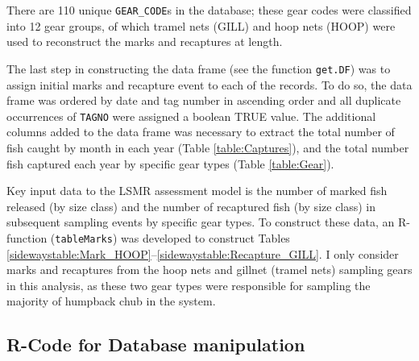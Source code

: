 There are 110 unique \verb"GEAR_CODE"s in the database; these gear codes were classified into 12 gear groups, of which tramel nets (GILL)  and hoop nets (HOOP) were used to reconstruct the marks and recaptures at length.

The last step in constructing the data frame (see the function \verb"get.DF") was to assign initial marks and recapture event to each of the records.  To do so, the data frame was ordered by date and tag number in ascending order and all duplicate occurrences of \verb"TAGNO" were assigned a boolean TRUE value.  The additional columns added to the data frame was necessary to extract the total number of fish caught by month in each year (Table \ref{table:Captures}), and the total number fish captured each year by specific gear types (Table \ref{table:Gear}).

Key input data to the LSMR assessment model is the number of marked fish released (by size class) and the number of recaptured fish (by size class) in subsequent sampling events by specific gear types.  To construct these data, an R-function (\verb"tableMarks") was developed to construct Tables \ref{sidewaystable:Mark_HOOP}--\ref{sidewaystable:Recapture_GILL}.  I only consider marks and recaptures from the hoop nets and gillnet (tramel nets) sampling gears in this analysis, as these two gear types were responsible for sampling the majority of humpback chub in the system.











\subsection{R-Code for Database manipulation} %
\label{sub:r_code_for_database_manipulation}
\footnotesize



